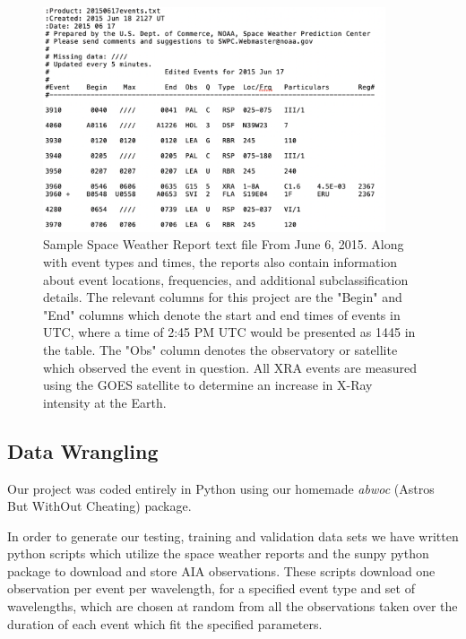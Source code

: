 \documentclass[12pt, letterpaper]{article}
\begin{document}
\begin{figure}[htb!]
    \includegraphics[width=0.9\textwidth]{figures/swr_sample.png}
    \centering
    \caption{Sample Space Weather Report text file From June 6, 2015. Along with event types and times, the reports also contain information about event locations, frequencies, and additional subclassification details. The relevant columns for this project are the "Begin" and "End" columns which denote the start and end times of events in UTC, where a time of 2:45 PM UTC would be presented as 1445 in the table. The "Obs" column denotes the observatory or satellite which observed the event in question. All XRA events are measured using the GOES satellite to determine an increase in X-Ray intensity at the Earth.}
    \label{swr_sample}
\end{figure}

\subsection*{Data Wrangling}

Our project was coded entirely in Python using our homemade \textit{abwoc} (Astros But WithOut Cheating) package.

In order to generate our testing, training and validation data sets we have written python scripts which utilize the space weather reports and the sunpy python package to download and store AIA observations. These scripts download one observation per event per wavelength, for a specified event type and set of wavelengths, which are chosen at random from all the observations taken over the duration of each event which fit the specified parameters.
\end{document}
